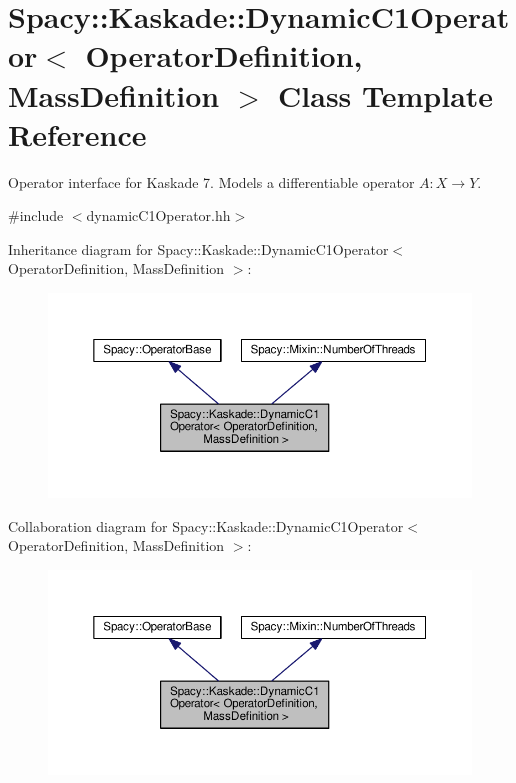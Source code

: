 \hypertarget{classSpacy_1_1Kaskade_1_1DynamicC1Operator}{}\section{Spacy\+:\+:Kaskade\+:\+:Dynamic\+C1\+Operator$<$ Operator\+Definition, Mass\+Definition $>$ Class Template Reference}
\label{classSpacy_1_1Kaskade_1_1DynamicC1Operator}


Operator interface for Kaskade 7. Models a differentiable operator $A:X\rightarrow Y$.  




{\ttfamily \#include $<$dynamic\+C1\+Operator.\+hh$>$}



Inheritance diagram for Spacy\+:\+:Kaskade\+:\+:Dynamic\+C1\+Operator$<$ Operator\+Definition, Mass\+Definition $>$\+:\nopagebreak
\begin{figure}[H]
\begin{center}
\leavevmode
\includegraphics[width=350pt]{classSpacy_1_1Kaskade_1_1DynamicC1Operator__inherit__graph}
\end{center}
\end{figure}


Collaboration diagram for Spacy\+:\+:Kaskade\+:\+:Dynamic\+C1\+Operator$<$ Operator\+Definition, Mass\+Definition $>$\+:\nopagebreak
\begin{figure}[H]
\begin{center}
\leavevmode
\includegraphics[width=350pt]{classSpacy_1_1Kaskade_1_1DynamicC1Operator__coll__graph}
\end{center}
\end{figure}
